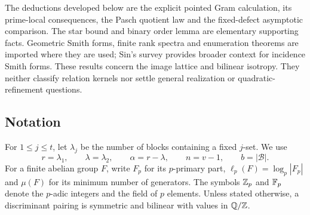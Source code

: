 The deductions developed below are the explicit pointed Gram calculation,
its prime-local consequences, the Pasch quotient law and the fixed-defect
asymptotic comparison. The star bound and binary order lemma are elementary
supporting facts. Geometric Smith forms, finite rank spectra and enumeration
theorems are imported where they are used; Sin's survey \cite{Sin2014}
provides broader context for incidence Smith forms. These results concern
the image lattice and bilinear isotropy. They neither classify relation
kernels nor settle general realization or quadratic-refinement questions.

\subsection{Notation}

For $1\le j\le t$, let $\lambda_j$ be the number of blocks containing a
fixed $j$-set. We use
\[
r=\lambda_1,\qquad \lambda=\lambda_2,\qquad
\alpha=r-\lambda,\qquad n=v-1,\qquad b=|\mathcal B|.
\]
For a finite abelian group $F$, write $F_p$ for its $p$-primary part,
$\ell_p(F)=\log_p|F_p|$ and $\mu(F)$ for its minimum number of generators.
The symbols $\mathbb{Z}_p$ and $\mathbb{F}_p$ denote the $p$-adic integers and the field
of $p$ elements. Unless stated otherwise, a discriminant pairing is
symmetric and bilinear with values in $\mathbb{Q}/\mathbb{Z}$.
